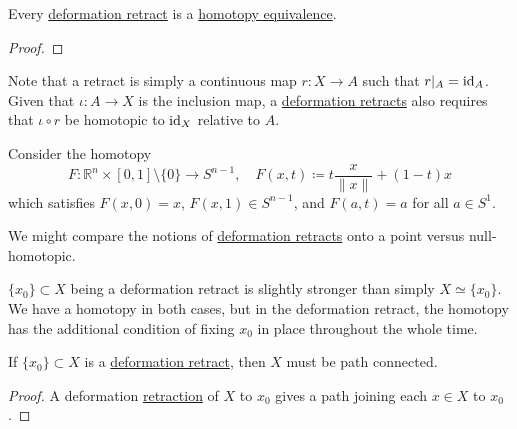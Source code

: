 	\begin{lemma}
	  \label{thm:deformation-retracts-are-homotopy-equivalences}
	  Every \hyperref[def:deformation-retract]{deformation retract} is a \hyperref[def:homotopy-equivalence]{homotopy equivalence}. 
	\end{lemma}
	\begin{proof}
	  
	\end{proof}

	Note that a retract is simply a continuous map $r: X \to A$ such that $r|_A = \operatorname{id}_A$. Given that $\iota: A \to X$ is the inclusion map, a \hyperref[def:deformation-retract]{deformation retracts} also requires that $\iota \circ r$ be homotopic to $\operatorname{id}_X$ relative to $A$. 

	\begin{example}
	  \label{ex:deformation-retract-of-sn1subsetrnsetminus0}
	  Consider the homotopy 
		\begin{equation}
			F: \mathbb{R}^n \times [0, 1] \setminus \{0\} \to S^{n-1}, \quad F(x, t) \coloneqq t \frac{x}{\|x\|} + (1 - t) x
		\end{equation} 
		which satisfies $F(x, 0) = x$, $F(x, 1) \in S^{n-1}$, and $F(a, t) = a$ for all $a \in S^1$. 
	\end{example}

	We might compare the notions of \hyperref[def:deformation-retract]{deformation retracts} onto a point versus null-homotopic. 

	\begin{example}
	  \label{ex:deformation-retract-onto-point-vs-null-homotopic}
		$\{x_0\} \subset X$ being a deformation retract is slightly stronger than simply $X \simeq \{x_0\}$. We have a homotopy in both cases, but in the deformation retract, the homotopy has the additional condition of fixing $x_0$ in place throughout the whole time.  
	\end{example}

	\begin{lemma}
	  \label{thm:deformation-retract-onto-point-must-be-path}
		If $\{x_0\} \subset X$ is a \hyperref[def:deformation-retract]{deformation retract}, then $X$ must be path connected. 
	\end{lemma}
	\begin{proof}
	  A deformation \hyperref[def:retraction]{retraction} of $X$ to $x_0$ gives a path joining each $x \in X$ to $x_0$. 
	\end{proof}

